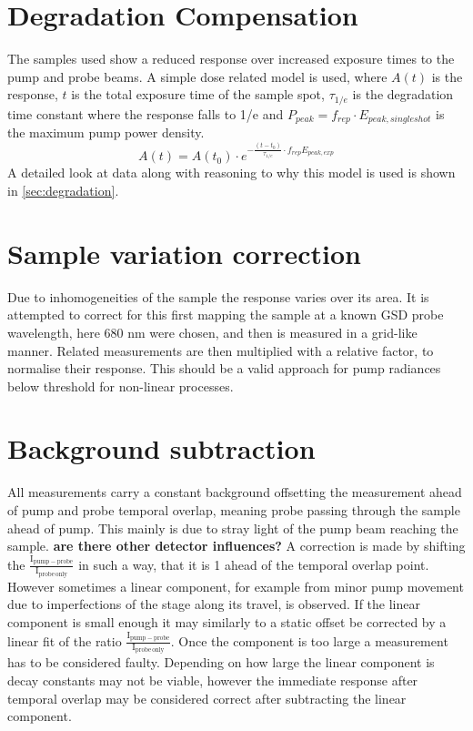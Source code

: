 \documentclass[twoside,openright]{scrreprt}
\begin{document}
\section{Degradation Compensation}
The samples used show a reduced response over increased exposure times to the pump and probe beams. A simple dose related model is used, where $A(t)$ is the response, $t$ is the total exposure time of the sample spot, $\tau_{1/e}$ is the degradation time constant where the response falls to 1/e and $P_{peak} = f_{rep}\cdot E_{peak, single shot}$ is the maximum pump power density.
\begin{equation}
A(t) = A(t_0)\cdot e^{-\frac{(t-t_0)}{\tau_{1/e}}\cdot f_{rep}E_{peak,exp}}
\end{equation}
A detailed look at data along with reasoning to why this model is used is shown in \ref{sec:degradation}.

\section{Sample variation correction}
Due to inhomogeneities of the sample the response varies over its area. It is attempted to correct for this first mapping the sample at a known GSD probe wavelength, here 680 nm were chosen, and then is measured in a grid-like manner. Related measurements are then multiplied with a relative factor, to normalise their response. This should be a valid approach for pump radiances below threshold for  non-linear processes.

\section{Background subtraction}
All measurements carry a constant background offsetting the measurement ahead of pump and probe temporal overlap, meaning probe passing through the sample ahead of pump. This mainly is due to stray light of the pump beam reaching the sample. \textbf{are there other detector influences?} A correction is made by shifting the $\mathrm{\frac{I_{pump-probe}}{I_{probe\, only}}}$ in such a way, that it is 1 ahead of the temporal overlap point. \\
However sometimes a linear component, for example from minor pump movement due to imperfections of the stage along its travel, is observed. If the linear component is small enough it may similarly to a static offset be corrected by a linear fit of the ratio $\mathrm{\frac{I_{pump-probe}}{I_{probe\, only}}}$. Once the component is too large a measurement has to be considered faulty. Depending on how large the linear component is decay constants may not be viable, however the immediate response after temporal overlap may be considered correct after subtracting the linear component.\\
\end{document}
